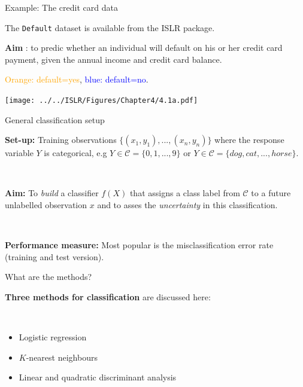 \documentclass[
  10pt,
  ignorenonframetext,
]{beamer}
\begin{document}
\begin{frame}[fragile]
\begin{block}{Example: The credit card data}
\protect\hypertarget{example-the-credit-card-data}{}
\vspace{2mm}

The \texttt{Default} dataset is available from the ISLR package.

\vspace{2mm}

\textbf{Aim} : to predic whether an individual will default on his or
her credit card payment, given the annual income and credit card
balance.

\textcolor{orange}{Orange: default=yes},
\textcolor{blue}{blue: default=no}.

\centering
\texttt{[image: ../../ISLR/Figures/Chapter4/4.1a.pdf]}
\end{block}
\end{frame}

\begin{frame}
\begin{block}{General classification setup}
\protect\hypertarget{general-classification-setup}{}
\(~\)

\textbf{Set-up:} Training observations
\(\{(x_1, y_1), ..., (x_n, y_n)\}\) where the response variable \(Y\) is
categorical, e.g \(Y \in \mathcal{C} = \{0, 1, ..., 9\}\) or
\(Y \in \mathcal{C} = \{dog, cat,... ,horse\}\).

\(~\)

\textbf{Aim: } To \emph{build} a classifier \(f(X)\) that assigns a
class label from \(\mathcal{C}\) to a future unlabelled observation
\(x\) and to asses the \emph{uncertainty} in this classification.

\(~\)

\textbf{Performance measure:} Most popular is the misclassification
error rate (training and test version).
\end{block}
\end{frame}

\begin{frame}
\begin{block}{What are the methods?}
\protect\hypertarget{what-are-the-methods}{}
\(~\)

\textbf{Three methods for classification} are discussed here:

\(~\)

\begin{itemize}
\item
  Logistic regression
\item
  \(K\)-nearest neighbours
\item
  Linear and quadratic discriminant analysis
\end{itemize}
\end{block}
\end{frame}
\end{document}
